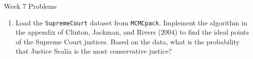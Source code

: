 \documentclass[10pt,a4paper]{article}
\author{Patrick Lam}
\begin{document}
\begin{center}
\begin{Large}Week 7 Problems\end{Large}
\end{center}
\bigskip
\begin{enumerate}
\item Load the {\tt SupremeCourt} dataset from {\tt MCMCpack}.  Implement the algorithm in the appendix of Clinton, Jackman, and Rivers (2004) to find the ideal points of the Supreme Court justices.  Based on the data, what is the probability that Justice Scalia is the most conservative justice?
\end{enumerate}
\end{document}
